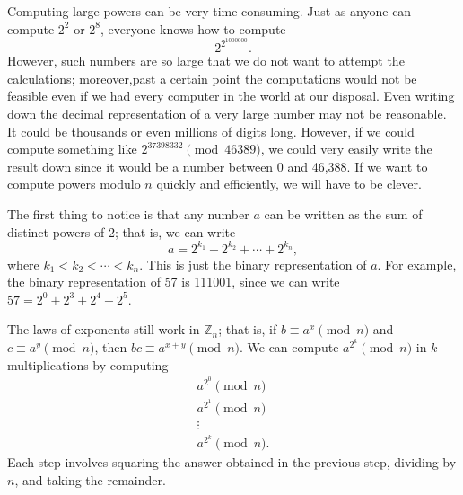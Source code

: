  
Computing large powers can be very time-consuming. Just as anyone can
compute $2^2$ or $2^8$, everyone knows how to compute
\[
2^{2^{1000000} }.
\]
However, such numbers are so large that we do not want to attempt the
calculations; moreover,past a certain point the computations would not
be feasible even if we had every computer in the world at our
disposal. Even 
writing down the decimal representation of a very large number may not
be reasonable. It could be thousands or even millions of digits long.
However, if we could compute something like $2^{37398332 } \pmod{
46389}$, we could very easily write the result down since it would be a
number between 0 and 46,388. If we want to compute powers modulo $n$
quickly and efficiently, we will have to be clever. 
 
 
The first thing to notice is that any number $a$ can be written as the
sum of distinct powers of 2; that is, we can write
\[
a = 2^{k_1} + 2^{k_2} + \cdots + 2^{k_n},
\]
where $k_1 < k_2 < \cdots < k_n$.  This is just the binary
representation of $a$. For example, the binary representation of 57 is
111001, since we can write $57 = 2^0 + 2^3 + 2^4 + 2^5$.
 
 
The laws of exponents still work in ${\mathbb Z}_n$; that is, if $b
\equiv a^x \pmod{ n}$ and $c \equiv a^y \pmod{ n}$, then $bc \equiv
a^{x+y} \pmod{ n}$. We can compute $a^{2^k} \pmod{ n}$ in $k$
multiplications by computing 
\begin{gather*}
a^{2^0} \pmod{ n} \\
a^{2^1} \pmod{ n }\\
\vdots \\
a^{2^k} \pmod{ n}.
\end{gather*}
Each step involves squaring the answer obtained in the previous step,
dividing by $n$, and taking the remainder.
 
